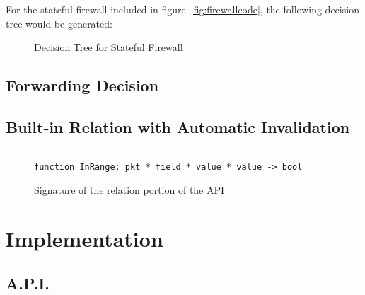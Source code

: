 \documentclass[12pt]{article}
\begin{document}
   
   

  For the stateful firewall included in figure~\ref{fig:firewallcode}, the following decision tree would be generated:


  \begin{figure}
\label{fig:decisiontree}  
\caption{Decision Tree for Stateful Firewall}     
\end{figure}
   

   

   \subsection*{Forwarding Decision}

   
   \subsection*{Built-in Relation with Automatic Invalidation}

   \begin{figure}
     \begin{lstlisting}
       
function InRange: pkt * field * value * value -> bool

\end{lstlisting}

\caption{Signature of the relation portion of the API}
\end{figure}

   
   
\section*{Implementation}

\subsection*{A.P.I.}
\end{document}
